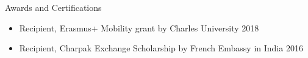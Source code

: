 
\begin{rSection}{\faTrophy \hspace{0.5mm} Awards and Certifications}
 
    \begin{itemize}
        \item Recipient, Erasmus+ Mobility grant by Charles University
            \hfill {2018}
        \item Recipient, Charpak Exchange Scholarship by French Embassy in India 
            \hfill {2016}
    \end{itemize}

\end{rSection}
